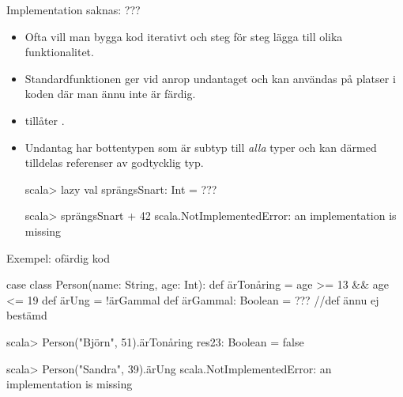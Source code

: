 



\begin{Slide}{Implementation saknas: ???}
\begin{itemize}
\item Ofta vill man bygga kod iterativt och steg för steg lägga till olika funktionalitet.

\item Standardfunktionen  ger vid anrop undantaget  och kan användas på platser i koden där man ännu inte är färdig.

\item {} tillåter .

\pause

\item Undantag har bottentypen  som är subtyp till \emph{alla} typer och kan därmed tilldelas referenser av godtycklig typ.

\begin{REPLnonum}
scala> lazy val sprängsSnart: Int = ???

scala> sprängsSnart + 42
scala.NotImplementedError: an implementation is missing
\end{REPLnonum}

\end{itemize}
\end{Slide}

\begin{Slide}{Exempel: ofärdig kod}
\begin{Code}[basicstyle=\SlideFontSize{9}{11}\ttfamily\selectfont]
case class Person(name: String, age: Int):
  def ärTonåring = age >= 13 && age <= 19
  def ärUng = !ärGammal
  def ärGammal: Boolean = ???   //def ännu ej bestämd
\end{Code}
\begin{REPLnonum}
scala> Person("Björn", 51).ärTonåring
res23: Boolean = false

scala> Person("Sandra", 39).ärUng
scala.NotImplementedError: an implementation is missing
\end{REPLnonum}
\end{Slide}



